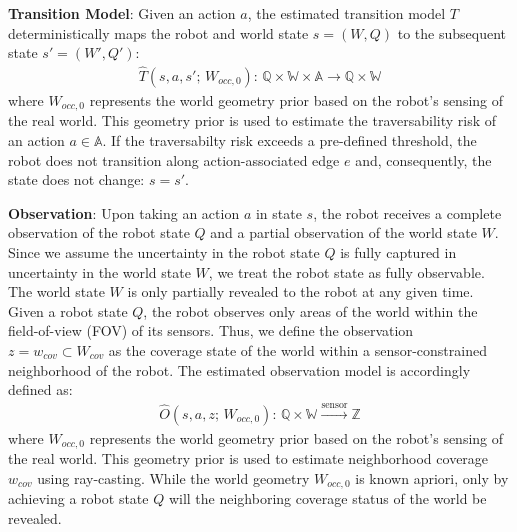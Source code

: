 \documentclass{article}
\newcommand{\ph}[1]{{\textbf{#1}:}} %
\begin{document}
\ph{Transition Model} Given an action $a$, the estimated transition model $T$ deterministically maps the robot and world state $s = (W, Q)$ to the subsequent state $s' = (W', Q')$:
\begin{align}
    \hat{T}(s, a, s'; \, W_{occ,0}): \, \mathbb{Q} \times \mathbb{W} \times \mathbb{A} \rightarrow \mathbb{Q} \times \mathbb{W}
\end{align}
where $W_{occ,0}$ represents the world geometry prior based on the robot's sensing of the real world. This geometry prior is used to estimate the traversability risk of an action $a \in \mathbb{A}$. If the traversabilty risk exceeds a pre-defined threshold, the robot does not transition along action-associated edge $e$ and, consequently, the state does not change: $s = s'$.


\ph{Observation} Upon taking an action $a$ in state $s$, the robot receives a complete observation of the robot state $Q$ and a partial observation of the world state $W$. Since we assume the uncertainty in the robot state $Q$ is fully captured in uncertainty in the world state $W$, we treat the robot state as fully observable. The world state $W$ is only partially revealed to the robot at any given time. Given a robot state $Q$, the robot observes only areas of the world within the field-of-view (FOV) of its sensors. Thus, we define the observation $z = w_{cov} \subset W_{cov}$ as the coverage state of the world within a sensor-constrained neighborhood of the robot. The estimated observation model is accordingly defined as:
\begin{align}
   \hat{O}(s, a, z; \, W_{occ,0}): \, \mathbb{Q} \times \mathbb{W} \xrightarrow{\text{sensor}} \mathbb{Z}
\end{align}
where $W_{occ,0}$ represents the world geometry prior based on the robot's sensing of the real world. This geometry prior is used to estimate neighborhood coverage $w_{cov}$ using ray-casting. While the world geometry $W_{occ,0}$ is known apriori, only by achieving a robot state $Q$ will the neighboring coverage status of the world be revealed.   
\end{document}
